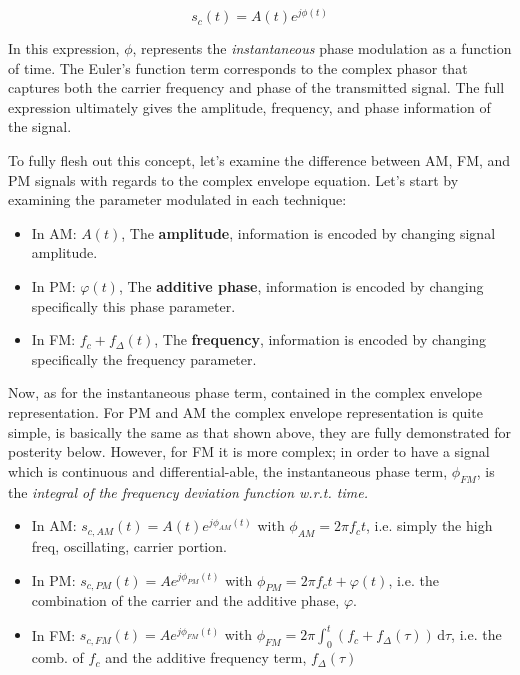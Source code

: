 \documentclass[colorlinks,11pt,a4paper,normalphoto,withhyper,ragged2e]{altareport}
\begin{document}
				\begin{equation}
					s_c(t) = A(t) e^{j \phi(t)}
				\end{equation}
				
				In this expression, $\phi$, represents the \textit{instantaneous} phase modulation as a function of time. The Euler's function term corresponds to the complex phasor that captures both the carrier frequency and phase of the transmitted signal. The full expression ultimately gives the amplitude, frequency, and phase information of the signal. \linebreak
				
				To fully flesh out this concept, let's examine the difference between AM, FM, and PM signals with regards to the complex envelope equation. Let's start by examining the parameter modulated in each technique: \linebreak
				
				\begin{itemize}[leftmargin=1cm]
					\item In AM: $A(t)$, The \textbf{amplitude}, information is encoded by changing signal amplitude. 
					\item In PM: $\varphi (t)$, The \textbf{additive phase}, information is encoded by changing specifically this phase parameter. 
					\item In FM: $f_c + f_{\Delta}(t)$, The \textbf{frequency}, information is encoded by changing specifically the frequency parameter. 
				\end{itemize}
				
				Now, as for the instantaneous phase term, contained in the complex envelope representation. For PM and AM the complex envelope representation is quite simple, is basically the same as that shown above, they are fully demonstrated for posterity below. \linebreak 
				However, for FM it is more complex; in order to have a signal which is continuous and differential-able, the instantaneous phase term, $\phi_{FM}$, is the \textit{integral of the frequency deviation function w.r.t. time.} \linebreak
				
				\begin{itemize}[leftmargin=1cm]
					\item In AM: $s_{c,AM}(t) = A(t)e^{j\phi_{AM}(t)}$  {\footnotesize with $\phi_{AM} = 2\pi f_c t$, i.e. simply the high freq, oscillating, carrier portion.}
					\item In PM: $s_{c,PM}(t) = Ae^{j\phi_{PM}(t)}$  {\footnotesize with $\phi_{PM} = 2\pi f_c t + \varphi (t)$, i.e. the combination of the carrier and the additive phase, $\varphi$.}
					\item In FM: $s_{c,FM}(t) = Ae^{j\phi_{FM}(t)}$ {\footnotesize with $\phi_{FM} = 2\pi \int_0^t (f_c + f_{\Delta}(\tau))\,\mathrm{d}\tau$, i.e. the comb. of $f_c$ and the additive frequency term, $f_{\Delta}(\tau)$}
				\end{itemize}
				
\end{document}
